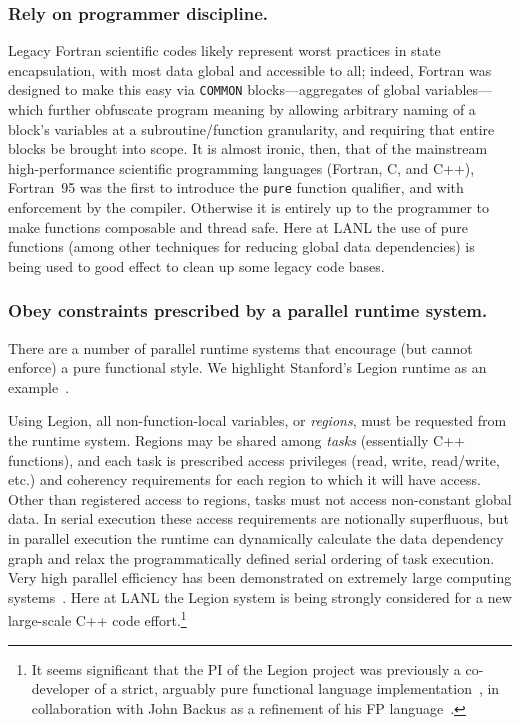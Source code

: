 \documentclass{llncs}
\begin{document}
\subsubsection{Rely on programmer discipline.}
Legacy Fortran scientific codes likely represent worst practices in state
encapsulation, with most data global and accessible to all; indeed, Fortran
was designed to make this easy via \texttt{COMMON} blocks---aggregates of
global variables---which further obfuscate program meaning by allowing
arbitrary naming of a block's variables at a subroutine/function granularity,
and requiring that entire blocks be brought into scope.  It is almost ironic,
then, that of the mainstream high-performance scientific programming languages
(Fortran, C, and C++), Fortran~95 was the first to introduce the \texttt{pure}
function qualifier, and with enforcement by the compiler.  Otherwise it is
entirely up to the programmer to make functions composable and thread safe.
Here at LANL the use of pure functions (among other techniques for reducing
global data dependencies) is being used to good effect to clean up some legacy
code bases.

\subsubsection{Obey constraints prescribed by a parallel runtime system.}
There are a number of parallel runtime systems that encourage (but cannot
enforce) a pure functional style.  We highlight Stanford's Legion
runtime as an example~\cite{Bauer12}.

Using Legion, all non-function-local variables, or \emph{regions}, must be
requested from the runtime system.  Regions may be shared among \emph{tasks}
(essentially C++ functions), and each task is prescribed access privileges
(read, write, read/write, etc.) and coherency requirements for each region to
which it will have access.  Other than registered access to regions, tasks
must not access non-constant global data.  In serial execution these access
requirements are notionally superfluous, but in parallel execution the runtime
can dynamically calculate the data dependency graph and relax the
programmatically defined serial ordering of task execution.  Very high
parallel efficiency has been demonstrated on extremely large computing
systems~\cite{Bauer14}.  Here at LANL the Legion system is being strongly
considered for a new large-scale C++ code effort.\footnote{It seems
  significant that the PI of the Legion project was previously a co-developer
  of a strict, arguably pure functional language
  implementation~\cite{AikenFL,FLreport89}, in collaboration with John Backus
  as a refinement of his FP language~\cite{Backus:1978}.}
\end{document}
